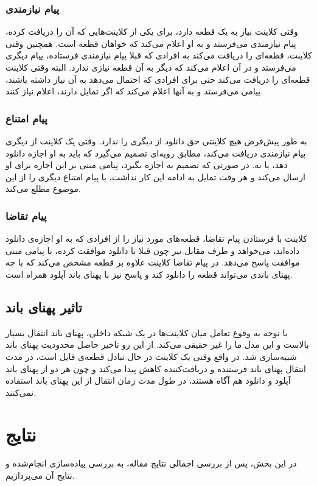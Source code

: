 \documentclass{article}
\begin{document}
\subsubsection{پیام نیازمندی}
وقتی کلاینت نیاز به یک قطعه دارد، برای یکی از کلاینت‌هایی که آن را دریافت کرده، پیام نیازمندی می‌فرستد و به او اعلام می‌کند که خواهان قطعه است. همچنین وقتی کلاینت، قطعه‌ای را دریافت می‌کند به افرادی که قبلا پیام نیازمندی فرستاده، پیام دیگری می‌فرستد و در آن اعلام می‌کند که دیگر به آن قطعه نیازی ندارد. البته وقتی کلاینت قطعه‌ای را دریافت می‌کند حتی برای افرادی که احتمال می‌دهد به آن نیاز داشته باشند، پیامی می‌فرستد و به آنها اعلام می‌کند که اگر تمایل دارند، اعلام نیاز کنند. 

\subsubsection{پیام امتناع}
به طور پیش‌فرض هیچ کلاینتی حق دانلود از دیگری را ندارد. وقتی یک کلاینت از دیگری پیام نیازمندی دریافت می‌کند، مطابق رویه‌ای تصمیم می‌گیرد که باید به او اجازه دانلود دهد، یا نه. در صورتی که تصمیم به اجازه بگیرد، پیامی مبنی بر این اجازه برای او ارسال می‌کند و هر وقت تمایل به ادامه این کار نداشت، با پیام امتناع دیگری را از این موضوع مطلع می‌کند.

\subsubsection{پیام تقاضا}
کلاینت با فرستادن پیام تقاضا، قطعه‌های مورد نیاز را از افرادی که به او اجازه‌ی دانلود داده‌اند، می‌خواهد و طرف مقابل نیز چون قبلا با دانلود موافقت کرده، با پیامی مبنی موافقت پاسخ می‌دهد. در پیام تقاضا کلاینت علاوه بر قطعه مشخص می‌کند که با چه پهنای باندی می‌تواند قطعه را دانلود کند و پاسخ نیز با پهنای باند آپلود همراه است.

\subsection{تاثیر پهنای باند}
با توجه به وقوع تعامل میان کلاینت‌ها در یک شبکه داخلی، پهنای باند انتقال بسیار بالاست و این مدل ما را غیر حقیقی می‌کند. از این رو تاخیر حاصل محدودیت پهنای باند شبیه‌سازی شد. در واقع وقتی یک کلاینت در حال تبادل قطعه‌ی فایل است، در مدت انتقال پهنای باند فرستنده و دریافت‌کننده کاهش پیدا می‌کند و چون هر دو از پهنای باند آپلود و دانلود هم آگاه هستند، در طول مدت زمان انتقال از این پهنای باند استفاده نمی‌کنند.

\section{نتایج} 
در این بخش، پس از بررسی اجمالی نتایج مقاله، به بررسی پیاده‌سازی انجام‌شده و نتایج آن می‌پردازیم.
\end{document}
